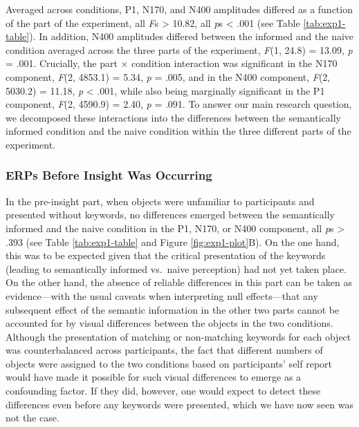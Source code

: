 \documentclass[
  english,
  man,floatsintext]{apa7}
\begin{document}
Averaged across conditions, P1, N170, and N400 amplitudes differed as a function of the part of the experiment, all \emph{F}s \textgreater{} 10.82, all \emph{p}s \textless{} .001 (see Table \ref{tab:exp1-table}). In addition, N400 amplitudes differed between the informed and the naive condition averaged across the three parts of the experiment, \emph{F}(1, 24.8) = 13.09, \emph{p} = .001. Crucially, the part × condition interaction was significant in the N170 component, \emph{F}(2, 4853.1) = 5.34, \emph{p} = .005, and in the N400 component, \emph{F}(2, 5030.2) = 11.18, \emph{p} \textless{} .001, while also being marginally significant in the P1 component, \emph{F}(2, 4590.9) = 2.40, \emph{p} = .091. To answer our main research question, we decomposed these interactions into the differences between the semantically informed condition and the naive condition within the three different parts of the experiment.

\hypertarget{erps-before-insight-was-occurring}{%
\subsubsection{ERPs Before Insight Was Occurring}\label{erps-before-insight-was-occurring}}

In the pre-insight part, when objects were unfamiliar to participants and presented without keywords, no differences emerged between the semantically informed and the naive condition in the P1, N170, or N400 component, all \emph{p}s \textgreater{} .393 (see Table \ref{tab:exp1-table} and Figure \ref{fig:exp1-plot}B). On the one hand, this was to be expected given that the critical presentation of the keywords (leading to semantically informed vs.~naive perception) had not yet taken place. On the other hand, the absence of reliable differences in this part can be taken as evidence---with the usual caveats when interpreting null effects---that any subsequent effect of the semantic information in the other two parts cannot be accounted for by visual differences between the objects in the two conditions. Although the presentation of matching or non-matching keywords for each object was counterbalanced across participants, the fact that different numbers of objects were assigned to the two conditions based on participants' self report would have made it possible for such visual differences to emerge as a confounding factor. If they did, however, one would expect to detect these differences even before any keywords were presented, which we have now seen was not the case.
\end{document}
